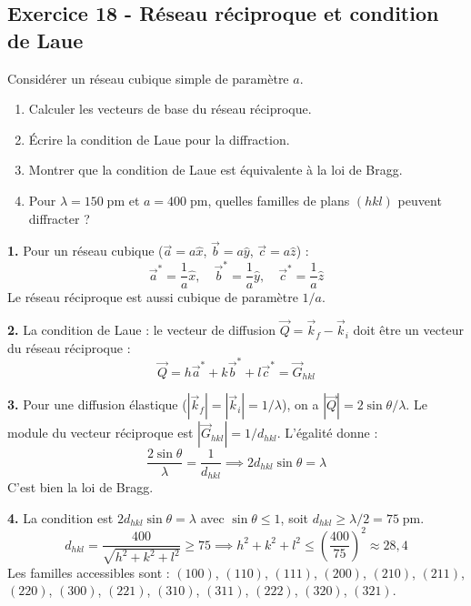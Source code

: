 \documentclass[12pt,a4paper]{article}
\begin{document}
\subsection*{Exercice 18 - Réseau réciproque et condition de Laue \niveau{\difficile}}

\begin{boiteexercice}
Considérer un réseau cubique simple de paramètre $a$.
\begin{enumerate}
  \item Calculer les vecteurs de base du réseau réciproque.
  \item Écrire la condition de Laue pour la diffraction.
  \item Montrer que la condition de Laue est équivalente à la loi de Bragg.
  \item Pour $\lambda = 150\;\text{pm}$ et $a = 400\;\text{pm}$, quelles familles de plans $(hkl)$ peuvent diffracter ?
\end{enumerate}
\end{boiteexercice}

\begin{boitecorrige}
\textbf{1.} Pour un réseau cubique ($\vec{a} = a\hat{x}$, $\vec{b} = a\hat{y}$, $\vec{c} = a\hat{z}$) :
\[
\vec{a}^* = \frac{1}{a}\hat{x}, \quad \vec{b}^* = \frac{1}{a}\hat{y}, \quad \vec{c}^* = \frac{1}{a}\hat{z}
\]
Le réseau réciproque est aussi cubique de paramètre $1/a$.

\textbf{2.} La condition de Laue : le vecteur de diffusion $\vec{Q} = \vec{k}_f - \vec{k}_i$ doit être un vecteur du réseau réciproque :
\[
\vec{Q} = h\vec{a}^* + k\vec{b}^* + l\vec{c}^* = \vec{G}_{hkl}
\]

\textbf{3.} Pour une diffusion élastique ($|\vec{k}_f| = |\vec{k}_i| = 1/\lambda$), on a $|\vec{Q}| = 2\sin\theta/\lambda$. Le module du vecteur réciproque est $|\vec{G}_{hkl}| = 1/d_{hkl}$. L'égalité donne :
\[
\frac{2\sin\theta}{\lambda} = \frac{1}{d_{hkl}} \implies 2d_{hkl}\sin\theta = \lambda
\]
C'est bien la loi de Bragg.

\textbf{4.} La condition est $2d_{hkl}\sin\theta = \lambda$ avec $\sin\theta \leq 1$, soit $d_{hkl} \geq \lambda/2 = 75\;\text{pm}$.
\[
d_{hkl} = \frac{400}{\sqrt{h^2+k^2+l^2}} \geq 75 \implies h^2+k^2+l^2 \leq \left(\frac{400}{75}\right)^2 \approx 28{,}4
\]
Les familles accessibles sont : $(100)$, $(110)$, $(111)$, $(200)$, $(210)$, $(211)$, $(220)$, $(300)$, $(221)$, $(310)$, $(311)$, $(222)$, $(320)$, $(321)$.
\end{boitecorrige}
\end{document}
